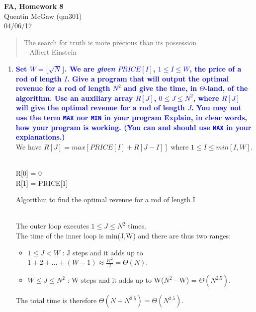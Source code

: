 \documentclass[11pt]{article}
\begin{document}
\begin{center} {\Large\bf FA, Homework 8} \\ Quentin McGaw (qm301) \\ 04/06/17
\end{center}

\begin{quote}
The search for truth is more precious than its possession
\\ --  Albert Einstein
\end{quote}

\begin{enumerate}
\item \textbf{\textcolor{blue}{Set $W=\lfloor{\sqrt{N}}\rfloor$. We are {\em given} $PRICE[I]$, $1\leq I\leq W$, the price of a rod of length $I$. Give a program that will output the optimal revenue for a rod of length $N^2$ and give the time, in $\Theta$-land, of the algorithm. Use an auxiliary array $R[J]$, $0\leq J\leq N^2$, where $R[J]$ will give the optimal revenue for a rod of length $J$. You may {\bf not} use the term {\tt MAX} nor {\tt MIN} in your program  Explain, in clear words, how your program is working. (You can and should use {\tt MAX} in your explanations.)}}
    \\ We have $R[J] = max[PRICE[I] + R[J-I]]$ where $1 \leq I \leq min[I, W]$. \\\\
    \begin{algorithm}
        R[0] = 0 \\
        R[1] = PRICE[1] \\
        \caption{Algorithm to find the optimal revenue for a rod of length I}
    \end{algorithm}
    \\ The outer loop executes $1 \leq J \leq N^2$ times.
    \\ The time of the inner loop is min(J,W) and there are thus two ranges:
    \begin{itemize}
        \item $1 \leq J < W$ : J steps and it adds up to $1 + 2 + ... + (W - 1) \approx \frac{W^2}{2} = \Theta(N)$.
        \item $W \leq J \leq N^2$ : W steps and it adds up to W($N^2$ - W) = $\Theta(N^{2.5})$.
    \end{itemize}
    The total time is therefore $\Theta(N + N^{2.5}) = \Theta(N^{2.5})$.
    

\end{enumerate}
\end{document}
